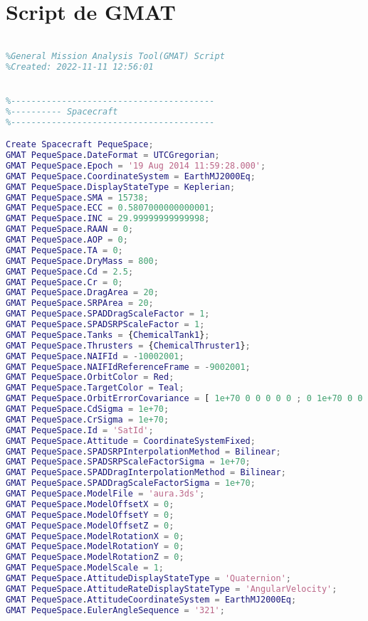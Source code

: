 \section{Script de GMAT}

\begin{lstlisting}[language=MATLAB, caption= Scrit de GMAT]

%General Mission Analysis Tool(GMAT) Script
%Created: 2022-11-11 12:56:01


%----------------------------------------
%---------- Spacecraft
%----------------------------------------

Create Spacecraft PequeSpace;
GMAT PequeSpace.DateFormat = UTCGregorian;
GMAT PequeSpace.Epoch = '19 Aug 2014 11:59:28.000';
GMAT PequeSpace.CoordinateSystem = EarthMJ2000Eq;
GMAT PequeSpace.DisplayStateType = Keplerian;
GMAT PequeSpace.SMA = 15738;
GMAT PequeSpace.ECC = 0.5807000000000001;
GMAT PequeSpace.INC = 29.99999999999998;
GMAT PequeSpace.RAAN = 0;
GMAT PequeSpace.AOP = 0;
GMAT PequeSpace.TA = 0;
GMAT PequeSpace.DryMass = 800;
GMAT PequeSpace.Cd = 2.5;
GMAT PequeSpace.Cr = 0;
GMAT PequeSpace.DragArea = 20;
GMAT PequeSpace.SRPArea = 20;
GMAT PequeSpace.SPADDragScaleFactor = 1;
GMAT PequeSpace.SPADSRPScaleFactor = 1;
GMAT PequeSpace.Tanks = {ChemicalTank1};
GMAT PequeSpace.Thrusters = {ChemicalThruster1};
GMAT PequeSpace.NAIFId = -10002001;
GMAT PequeSpace.NAIFIdReferenceFrame = -9002001;
GMAT PequeSpace.OrbitColor = Red;
GMAT PequeSpace.TargetColor = Teal;
GMAT PequeSpace.OrbitErrorCovariance = [ 1e+70 0 0 0 0 0 ; 0 1e+70 0 0 0 0 ; 0 0 1e+70 0 0 0 ; 0 0 0 1e+70 0 0 ; 0 0 0 0 1e+70 0 ; 0 0 0 0 0 1e+70 ];
GMAT PequeSpace.CdSigma = 1e+70;
GMAT PequeSpace.CrSigma = 1e+70;
GMAT PequeSpace.Id = 'SatId';
GMAT PequeSpace.Attitude = CoordinateSystemFixed;
GMAT PequeSpace.SPADSRPInterpolationMethod = Bilinear;
GMAT PequeSpace.SPADSRPScaleFactorSigma = 1e+70;
GMAT PequeSpace.SPADDragInterpolationMethod = Bilinear;
GMAT PequeSpace.SPADDragScaleFactorSigma = 1e+70;
GMAT PequeSpace.ModelFile = 'aura.3ds';
GMAT PequeSpace.ModelOffsetX = 0;
GMAT PequeSpace.ModelOffsetY = 0;
GMAT PequeSpace.ModelOffsetZ = 0;
GMAT PequeSpace.ModelRotationX = 0;
GMAT PequeSpace.ModelRotationY = 0;
GMAT PequeSpace.ModelRotationZ = 0;
GMAT PequeSpace.ModelScale = 1;
GMAT PequeSpace.AttitudeDisplayStateType = 'Quaternion';
GMAT PequeSpace.AttitudeRateDisplayStateType = 'AngularVelocity';
GMAT PequeSpace.AttitudeCoordinateSystem = EarthMJ2000Eq;
GMAT PequeSpace.EulerAngleSequence = '321';




\end{lstlisting}
